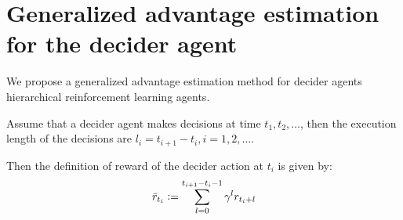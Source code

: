 \section{Generalized advantage estimation for the decider agent}
We propose a generalized advantage estimation method for decider agents hierarchical reinforcement learning agents. 

Assume that a decider agent makes decisions at time $t_1,t_2,\dots$, then the execution length of the decisions are $l_i = t_{i+1} - t_i, i=1,2,\dots$.

Then the definition of reward of the decider action at $t_i$ is given by:
\begin{align}
\bar{r}_{t_i} \vcentcolon=
 \sum_{l=0}^{t_{i+1}-t_i-1}
  \gamma^l r_{t_i+l}
\end{align}

